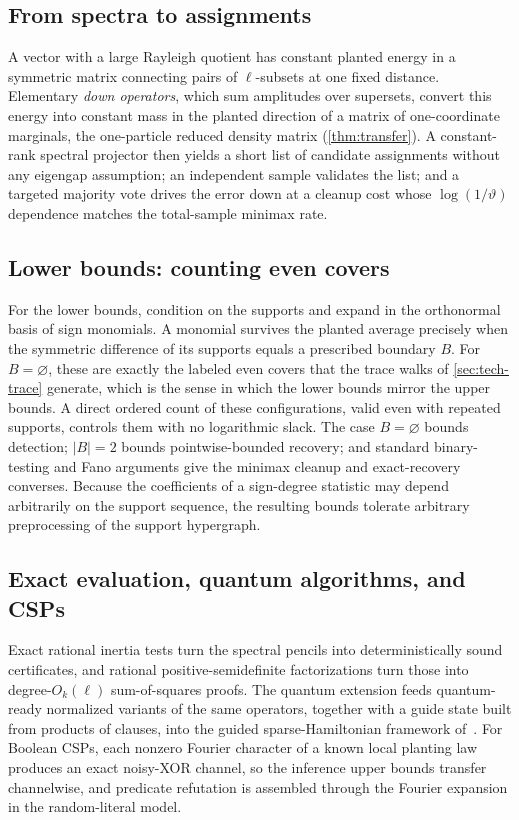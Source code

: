 \documentclass[11pt]{article}
\theoremstyle{definition}
\theoremstyle{remark}
\newcommand{\1}{\mathbf 1}
\numberwithin{equation}{section}
\begin{document}
\subsection{From spectra to assignments}\label{sec:tech-recovery}

A vector with a large Rayleigh quotient has constant planted energy in a
symmetric matrix connecting pairs of $\ell$-subsets at one fixed
distance.  Elementary \emph{down operators}, which sum amplitudes over
supersets, convert this energy into constant mass in the planted
direction of a matrix of one-coordinate marginals, the one-particle
reduced density matrix (\cref{thm:transfer}).  A constant-rank spectral
projector then yields a short list of candidate assignments without any
eigengap assumption; an independent sample validates the list; and a
targeted majority vote drives the error down at a cleanup cost whose
$\log(1/\vartheta)$ dependence matches the total-sample minimax rate.

\subsection{Lower bounds: counting even covers}\label{sec:tech-lower}

For the lower bounds, condition on the supports and expand in the
orthonormal basis of sign monomials.  A monomial survives the planted
average precisely when the symmetric difference of its supports equals a
prescribed boundary $B$.  For $B=\varnothing$, these are exactly the
labeled even covers that the trace walks of \cref{sec:tech-trace}
generate, which is the sense in which the lower bounds mirror the upper
bounds.  A direct ordered count of these configurations, valid even with
repeated supports, controls them with no logarithmic slack.  The case
$B=\varnothing$ bounds detection; $|B|=2$ bounds pointwise-bounded
recovery; and standard binary-testing and Fano arguments give the
minimax cleanup and exact-recovery converses.  Because the coefficients
of a sign-degree statistic may depend arbitrarily on the support
sequence, the resulting bounds tolerate arbitrary preprocessing of the
support hypergraph.

\subsection{Exact evaluation, quantum algorithms, and CSPs}
\label{sec:tech-ext}

Exact rational inertia tests turn the spectral pencils into
deterministically sound certificates, and rational positive-semidefinite
factorizations turn those into degree-$O_k(\ell)$ sum-of-squares
proofs.  The quantum extension feeds quantum-ready normalized variants
of the same operators, together with a guide state built from products
of clauses, into the guided sparse-Hamiltonian framework
of~\cite{SOKB}.  For Boolean CSPs, each nonzero Fourier character of a
known local planting law produces an exact noisy-XOR channel, so the
inference upper bounds transfer channelwise, and predicate refutation
is assembled through the Fourier expansion in the random-literal model.
\end{document}
